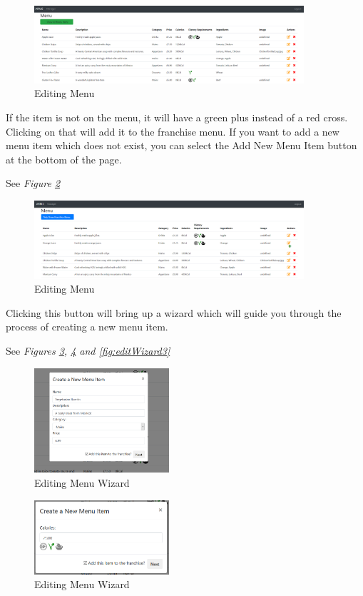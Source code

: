 \documentclass[12pt, twoside, a4paper]{report}
\begin{document}
\begin{figure}[H]
  \centering
  \includegraphics[width=10cm]{editMenu1.png}
  \caption{Editing Menu}
  \label{fig:editMenu1}
\end{figure}

If the item is not on the menu, it will have a green plus instead of a red cross. Clicking on that will add it to the franchise menu. If you want to add a new menu item which does not exist, you can select the Add New Menu Item button at the bottom of the page.

See \textit{Figure \ref{fig:editMenu2}}
\begin{figure}[H]
  \centering
  \includegraphics[width=10cm]{editMenu2.png}
  \caption{Editing Menu}
  \label{fig:editMenu2}
\end{figure}

Clicking this button will bring up a wizard which will guide you through the process of creating a new menu item.

See \textit{Figures \ref{fig:editWizard1}, \ref{fig:editWizard2} and \ref{fig:editWizard3}}

\begin{figure}[H]
  \centering
  \includegraphics[width=5cm]{editWizard1.png}
  \caption{Editing Menu Wizard}
  \label{fig:editWizard1}
\end{figure}

\begin{figure}[H]
  \centering
  \includegraphics[width=5cm]{editWizard2.png}
  \caption{Editing Menu Wizard}
  \label{fig:editWizard2}
\end{figure}
\end{document}
